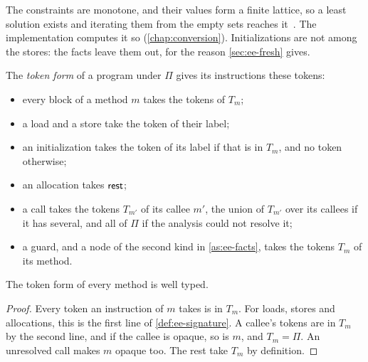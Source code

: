 The constraints are monotone, and their values form a finite lattice, so a least
solution exists and iterating them from the empty sets reaches
it~\cite{tarski1955lattice}. The implementation computes it so
(\cref{chap:conversion}). Initializations are not among the stores: the facts
leave them out, for the reason \cref{sec:ee-fresh} gives.

\begin{definition}\label{def:ee-token-form}
The \emph{token form} of a program under $\Pi$ gives its instructions these
tokens:
\begin{itemize}
\item every block of a method $m$ takes the tokens of $T_m$;
\item a load and a store take the token of their label;
\item an initialization takes the token of its label if that is in $T_m$, and no
  token otherwise;
\item an allocation takes $\mathsf{rest}$;
\item a call takes the tokens $T_{m'}$ of its callee $m'$, the union of $T_{m'}$
  over its callees if it has several, and all of $\Pi$ if the analysis could not
  resolve it;
\item a guard, and a node of the second kind in \cref{as:ee-facts}, takes the
  tokens $T_m$ of its method.
\end{itemize}
\end{definition}

\begin{lemma}\label{lem:ee-token-form-typed}
The token form of every method is well typed.
\end{lemma}

\begin{proof}
Every token an instruction of $m$ takes is in $T_m$. For loads, stores and
allocations, this is the first line of \cref{def:ee-signature}. A callee's
tokens are in $T_m$ by the second line, and if the callee is opaque, so is $m$,
and $T_m = \Pi$. An unresolved call makes $m$ opaque too. The rest take $T_m$
by definition.
\end{proof}

